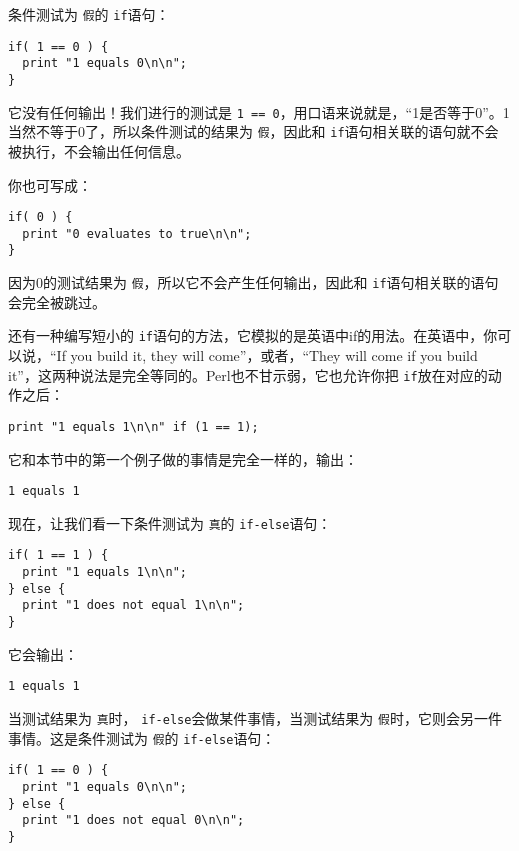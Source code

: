 条件测试为 \verb|假|的 \verb|if|语句：

\begin{lstlisting}
if( 1 == 0 ) {
  print "1 equals 0\n\n";
}
\end{lstlisting}

它没有任何输出！我们进行的测试是 \verb|1 == 0|，用口语来说就是，“1是否等于0”。1当然不等于0了，所以条件测试的结果为 \verb|假|，因此和 \verb|if|语句相关联的语句就不会被执行，不会输出任何信息。

你也可写成：

\begin{lstlisting}
if( 0 ) {
  print "0 evaluates to true\n\n";
}
\end{lstlisting}

因为0的测试结果为 \verb|假|，所以它不会产生任何输出，因此和 \verb|if|语句相关联的语句会完全被跳过。

还有一种编写短小的 \verb|if|语句的方法，它模拟的是英语中if的用法。在英语中，你可以说，“If you build it, they will come”，或者，“They will come if you build it”，这两种说法是完全等同的。Perl也不甘示弱，它也允许你把 \verb|if|放在对应的动作之后：

\begin{lstlisting}
print "1 equals 1\n\n" if (1 == 1);
\end{lstlisting}

它和本节中的第一个例子做的事情是完全一样的，输出：

\begin{lstlisting}
1 equals 1
\end{lstlisting}

现在，让我们看一下条件测试为 \verb|真|的 \verb|if-else|语句：

\begin{lstlisting}
if( 1 == 1 ) {
  print "1 equals 1\n\n";
} else {
  print "1 does not equal 1\n\n";
}
\end{lstlisting}

它会输出：

\begin{lstlisting}
1 equals 1
\end{lstlisting}

当测试结果为 \verb|真|时， \verb|if-else|会做某件事情，当测试结果为 \verb|假|时，它则会另一件事情。这是条件测试为 \verb|假|的 \verb|if-else|语句：

\begin{lstlisting}
if( 1 == 0 ) {
  print "1 equals 0\n\n";
} else {
  print "1 does not equal 0\n\n";
}
\end{lstlisting}

